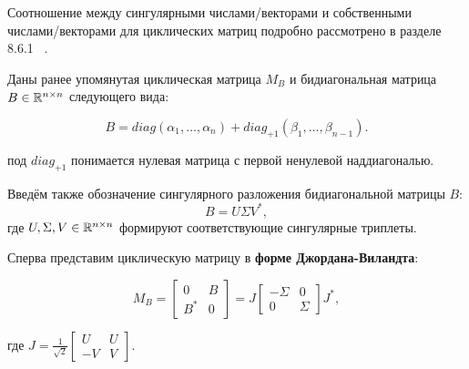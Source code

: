Соотношение между сингулярными числами/векторами и собственными числами/векторами для циклических матриц подробно рассмотрено в разделе 8.6.1 ~\cite{Golub2013}. 


Даны ранее упомянутая циклическая матрица \(M_B\) и бидиагональная матрица \(B \in \mathbb{R}^{n \times n}\) следующего вида:

\begin{equation}
    B= diag(\alpha_1,\dots,\alpha_n)+diag_{+1}(\beta_1,\dots,\beta_{n-1}).
\end{equation}

\begin{note}
    под \(diag_{+1}\) понимается нулевая матрица с первой ненулевой наддиагональю.
\end{note}

\begin{note}
    Введём также обозначение сингулярного разложения бидиагональной матрицы \(B\):
    \[
    B=U\Sigma V^*,
    \]
    где \(U,\Sigma,V \in \mathbb{R}^{n \times n}\) формируют соответствующие сингулярные триплеты.
\end{note}
Сперва представим циклическую матрицу в \textbf{форме Джордана-Виландта}:

\begin{equation}
    M_B= \begin{bmatrix}
        0 & B \\
        B^* & 0
    \end{bmatrix} = J
    \begin{bmatrix}
        -\Sigma & 0 \\
        0 & \Sigma
    \end{bmatrix} J^*,
\end{equation}

где \(J= \frac{1}{\sqrt{2}}\begin{bmatrix}
    U & U \\
    -V & V
\end{bmatrix}\).

